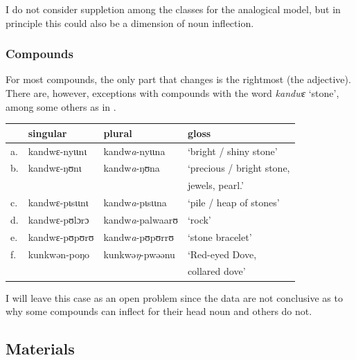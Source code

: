 I do not consider suppletion among the classes for the analogical model, but in principle this could also be a dimension of noun inflection.

\subsubsection{Compounds}

For most compounds, the only part that changes is the rightmost (the adjective). There are, however, exceptions with compounds with the word \textit{kandwɛ} `stone', among some others as in .

\begin{exe}
    \ex \label{except-stone}
    \begin{tabular}[t]{llll}
         & singular       & plural                   & gloss                          \\
      \midrule
      a. & kandwɛ-nyɩɩnɩ  & kandw\textit{a}-nyɩɩna   & `bright / shiny stone'         \\
      b. & kandwɛ-ŋʊnɩ    & kandw\textit{a}-ŋʊna     & `precious / bright stone,       \\
         &                &                          & jewels, pearl.'              \\
      c. & kandwɛ-pɩsɩɩnɩ & kandw\textit{a}-pɩsɩɩna  & `pile / heap of stones'        \\
      d. & kandwɛ-pʊlɔrɔ  & kandw\textit{a}-palwaarʊ & `rock'                         \\
      e. & kandwɛ-pʊpʊrʊ  & kandw\textit{a}-pʊpʊrrʊ  & `stone bracelet'               \\
      f. & kunkwən-poŋo   & kunkwə\textit{ŋ}-pwəənu  & `Red-eyed Dove,\\
      &&&  collared dove' \\
    \end{tabular}
\end{exe}

I will leave this case as an open problem since the data are not conclusive as to why some compounds can inflect for their head noun and others do not.

\subsection{Materials}

